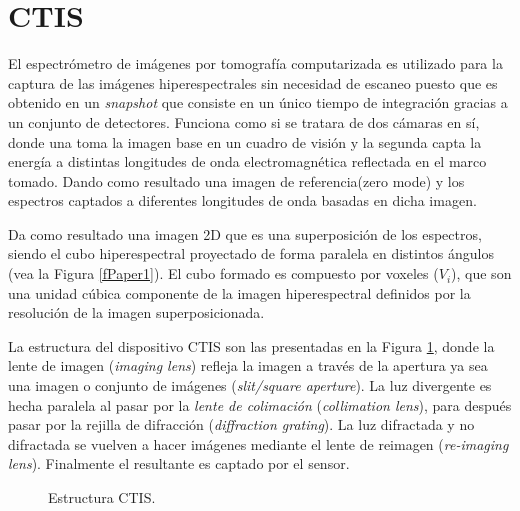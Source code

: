 \section{CTIS}
\label{CTIS}
El espectrómetro de imágenes por tomografía computarizada es utilizado para la captura de las imágenes hiperespectrales sin necesidad de escaneo puesto que es obtenido en un \textit{snapshot} que consiste en un único tiempo de integración gracias a un conjunto de detectores.
Funciona como si se tratara de dos cámaras en sí, donde una toma la imagen base en un cuadro de visión y la segunda capta la energía a distintas longitudes de onda electromagnética reflectada en el marco tomado.
Dando como resultado una imagen de referencia(zero mode) y los espectros captados a diferentes longitudes de onda basadas en dicha imagen.

Da como resultado una imagen 2D que es una superposición de los espectros, siendo el cubo hiperespectral proyectado de forma paralela en distintos ángulos (vea la Figura \ref{fPaper1}). El cubo formado es compuesto por voxeles ($V_i$), que son una unidad cúbica componente de la imagen hiperespectral definidos por la resolución de la imagen superposicionada.

La estructura del dispositivo CTIS son las presentadas en la Figura \ref{fCTIS}, donde la lente de imagen (\textit{imaging lens}) refleja la imagen a través de la apertura ya sea una imagen o conjunto de imágenes (\textit{slit/square aperture}). La luz divergente es hecha paralela al pasar por la \textit{lente de colimación} (\textit{collimation lens}), para después pasar por la rejilla de difracción (\textit{diffraction grating}). La luz difractada y no difractada se vuelven a hacer imágenes mediante el lente de reimagen (\textit{re-imaging lens}). Finalmente el resultante es captado por el sensor.

\begin{figure}[h]
  \centering
  \centering
  \caption{Estructura CTIS. \cite{PracCam}}
  \label{fCTIS}
\end{figure}

